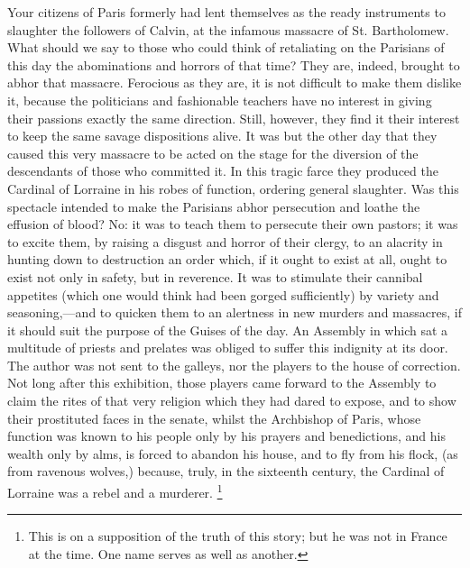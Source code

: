 Your citizens of Paris formerly had lent themselves as the ready instruments to slaughter the followers of Calvin, at the infamous massacre of St. Bartholomew. What should we say to those who could think of retaliating on the Parisians of this day the abominations and horrors of that time? They are, indeed, brought to abhor that massacre. Ferocious as they are, it is not difficult to make them dislike it, because the politicians and fashionable teachers have no interest in giving their passions exactly the same direction. Still, however, they find it their interest to keep the same savage dispositions alive. It was but the other day that they caused this very massacre to be acted on the stage for the diversion of the descendants of those who committed it. In this tragic farce they produced the Cardinal of Lorraine in his robes of function, ordering general slaughter. Was this spectacle intended to make the Parisians abhor persecution and loathe the effusion of blood? No: it was to teach them to persecute their own pastors; it was to excite them, by raising a disgust and horror of their clergy, to an alacrity in hunting down to destruction an order which, if it ought to exist at all, ought to exist not only in safety, but in reverence. It was to stimulate their cannibal appetites (which one would think had been gorged sufficiently) by variety and seasoning,—and to quicken them to an alertness in new murders and massacres, if it should suit the purpose of the Guises of the day. An Assembly in which sat a multitude of priests and prelates was obliged to suffer this indignity at its door. The author was not sent to the galleys, nor the players to the house of correction. Not long after this exhibition, those players came forward to the Assembly to claim the rites of that very religion which they had dared to expose, and to show their prostituted faces in the senate, whilst the Archbishop of Paris, whose function was known to his people only by his prayers and benedictions, and his wealth only by alms, is forced to abandon his house, and to fly from his flock, (as from ravenous wolves,) because, truly, in the sixteenth century, the Cardinal of Lorraine was a rebel and a murderer.
\footnote{ This is on a supposition of the truth of this story; but he was not in France at the time. One name serves as well as another.}


